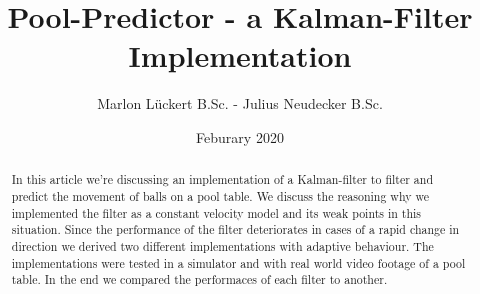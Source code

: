 \documentclass[notitlepage, a4paper, 11pt]{scrartcl}
\begin{document}
\title{Pool-Predictor - a Kalman-Filter Implementation}
\author{Marlon Lückert B.Sc. - Julius Neudecker B.Sc.}
\date{Feburary 2020}

\maketitle

\begin{abstract}
In this article we're discussing an implementation of a Kalman-filter \cite{kalman} to filter and predict the movement of balls on a pool table. 
We discuss the reasoning why we implemented the filter as a constant velocity model and its weak points in this situation.
Since the performance of the filter deteriorates in cases of a rapid change in direction we derived two different implementations with adaptive behaviour.
The implementations were tested in a simulator and with real world video footage of a pool table.
In the end we compared the performaces of each filter to another.

\end{abstract}
\end{document}
